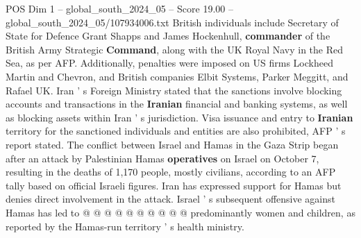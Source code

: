 \begin{textsample}{POS Dim 1 – global\_south\_2024\_05 – Score 19.00 – global\_south\_2024\_05/107934006.txt}
British individuals include Secretary of State for Defence Grant Shapps and James Hockenhull, \textbf{commander} of the British Army Strategic \textbf{Command}, along with the UK Royal Navy in the Red Sea, as per AFP.
Additionally, penalties were imposed on US firms Lockheed Martin and Chevron, and British companies Elbit Systems, Parker Meggitt, and Rafael UK.
Iran ' s Foreign Ministry stated that the sanctions involve blocking accounts and transactions in the \textbf{Iranian} financial and banking systems, as well as blocking assets within Iran ' s jurisdiction.
Visa issuance and entry to \textbf{Iranian} territory for the sanctioned individuals and entities are also prohibited, AFP ' s report stated.
The conflict between Israel and Hamas in the Gaza Strip began after an attack by Palestinian Hamas \textbf{operatives} on Israel on October 7, resulting in the deaths of 1,170 people, mostly civilians, according to an AFP tally based on official Israeli figures.
Iran has expressed support for Hamas but denies direct involvement in the attack.
Israel ' s subsequent offensive against Hamas has led to @ @ @ @ @ @ @ @ @ @ predominantly women and children, as reported by the Hamas-run territory ' s health ministry.

\end{textsample}
